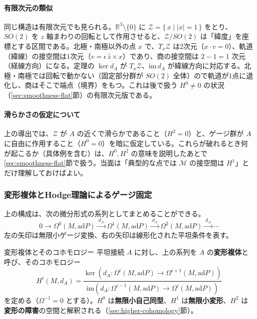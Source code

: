 \documentclass[uplatex, dvipdfmx, book]{jsbook}
\let\origsubsubsection\subsubsection
\renewcommand{\subsection}{\origsubsubsection}
\renewcommand{\subsubsection}{\paragraph}
\begin{document}
\paragraph{有限次元の類似}
同じ構造は有限次元でも見られる。$\mathbb{R}^3\setminus\{0\}$ に $\mathcal{Z} = \{\,x \mid |x| = 1\,\}$ をとり、$SO(2)$ を $z$ 軸まわりの回転として作用させると、$\mathcal{Z}/SO(2)$ は「緯度」を座標とする区間である。北極・南極以外の点 $x$ で、$T_x\mathcal{Z}$ は2次元（$x\cdot v = 0$）、軌道（緯線）の接空間は1次元（$v = \epsilon\, \hat{z}\times x$）であり、商の接空間は $2 - 1 = 1$ 次元（経線方向）になる。定理の $\ker d_A$ が $T_x\mathcal{Z}$、$\mathrm{im}\,d_A$ が緯線方向に対応する。北極・南極では回転で動かない（固定部分群が $SO(2)$ 全体）ので軌道が1点に退化し、商はそこで端点（境界）をもつ。これは後で扱う $H^0 \neq 0$ の状況（\ref{sec:smoothness-flat}節）の有限次元版である。

\paragraph{滑らかさの仮定について}
上の導出では、$\mathcal{Z}$ が $A$ の近くで滑らかであること（$H^2 = 0$）と、ゲージ群が $A$ に自由に作用すること（$H^0 = 0$）を暗に仮定している。これらが破れるとき何が起こるか（具体例を含む）は、$H^0, H^2$ の意味を説明したあとで\ref{sec:smoothness-flat}節で扱う。当面は「典型的な点では $\mathcal{M}$ の接空間は $H^1$」とだけ理解しておけばよい。

\subsection{変形複体とHodge理論によるゲージ固定}

上の構成は、次の微分形式の系列としてまとめることができる。
\begin{equation}
    0 \longrightarrow \Omega^0(M, \mathrm{ad}P) \xrightarrow{\ d_A\ } \Omega^1(M, \mathrm{ad}P) \xrightarrow{\ d_A\ } \Omega^2(M, \mathrm{ad}P) \xrightarrow{\ d_A\ } \cdots
\end{equation}
左の矢印は無限小ゲージ変換、右の矢印は線形化された平坦条件を表す。

\begin{mydef}{変形複体とそのコホモロジー}{}
平坦接続 $A$ に対し、上の系列を $A$ の\textbf{変形複体}と呼び、そのコホモロジー
\begin{equation*}
    H^i(M, d_A) = \frac{\ker (d_A: \Omega^i(M, \mathrm{ad}P) \to \Omega^{i+1}(M, \mathrm{ad}P))}{\mathrm{im} (d_A: \Omega^{i-1}(M, \mathrm{ad}P) \to \Omega^{i}(M, \mathrm{ad}P))}
\end{equation*}
を定める（$\Omega^{-1} = 0$ とする）。$H^0$ は\textbf{無限小自己同型}、$H^1$ は\textbf{無限小変形}、$H^2$ は\textbf{変形の障害}の空間と解釈される（\ref{sec:higher-cohomology}節）。
\end{mydef}
\end{document}
